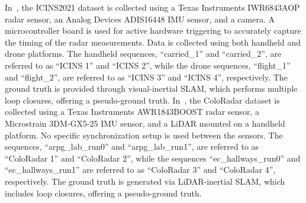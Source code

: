 In~\cite{9470842}, the ICINS2021 dataset is collected using a Texas Instruments IWR6843AOP radar sensor, an Analog Devices ADIS16448 IMU sensor, and a camera. A microcontroller board is used for active hardware triggering to accurately capture the timing of the radar measurements. Data is collected using both handheld and drone platforms. The handheld sequences, ``carried\_1'' and ``carried\_2'', are referred to as ``ICINS 1'' and ``ICINS 2'', while the drone sequences, ``flight\_1'' and ``flight\_2'', are referred to as ``ICINS 3'' and ``ICINS 4'', respectively. The ground truth is provided through visual-inertial SLAM, which performs multiple loop closures, offering a pseudo-ground truth. In~\cite{kramer2022coloradar}, the ColoRadar dataset is collected using a Texas Instruments AWR1843BOOST radar sensor, a Microstrain 3DM-GX5-25 IMU sensor, and a LiDAR mounted on a handheld platform. No specific synchronization setup is used between the sensors. The sequences, ``arpg\_lab\_run0'' and ``arpg\_lab\_run1'', are referred to as ``ColoRadar 1'' and ``ColoRadar 2'', while the sequences ``ec\_hallways\_run0'' and ``ec\_hallways\_run1'' are referred to as ``ColoRadar 3'' and ``ColoRadar 4'', respectively. The ground truth is generated via LiDAR-inertial SLAM, which includes loop closures, offering a pseudo-ground truth.